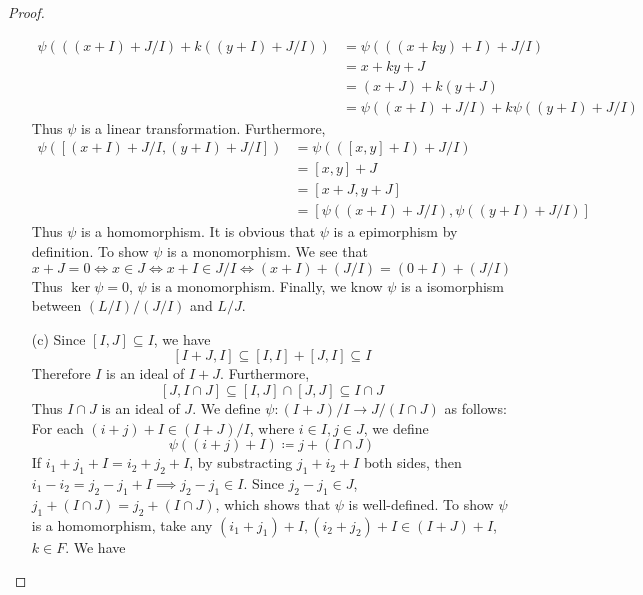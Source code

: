 \documentclass[../main.tex]{subfiles}
\begin{document}
\begin{proof}
\begin{enumerate}
\[\begin{aligned}
          \psi \left( \left( \left( x+ I \right)+ J/I  \right)+ k \left( \left( y+ I \right)+ J /I  \right)   \right)&=  \psi \left( \left(\left( x+ ky \right)+ I  \right)+ J/I  \right)  \\ 
           &= x+ ky+ J\\ 
            &= \left( x+ J \right)+ k\left( y+ J \right)\\ 
             &=  \psi \left( \left( x+ I \right)+  J / I  \right)+  k \psi  \left( \left( y+ I \right)+  J / I  \right)    
         \end{aligned} 
          \]  Thus \(  \psi   \) is a linear transformation. Furthermore, \[
          \begin{aligned}
          \psi \left( [\left( x+ I \right)+ J/I , \left( y+ I \right)+ J /I ] \right)&= \psi \left( \left( [x,y]+ I \right)+ J/I  \right)\\ 
           &= [x,y]   + J\\ 
            &= [x+ J, y+ J]\\ 
             &= [\psi \left( \left( x+ I \right)+ J / I  \right), \psi \left( \left( y+ I \right)+ J / I  \right)  ]
          \end{aligned}
          \] Thus \(  \psi   \) is a homomorphism. It is obvious that \(  \psi   \) is a epimorphism by definition. To show \(  \psi   \) is a monomorphism. We see that \[
          x+ J= 0\iff x \in J\iff x+ I \in J/I\iff \left( x+ I \right)+ \left( J / I \right)= \left( 0+ I \right)+  \left( J / I \right)    
          \]Thus \(  \operatorname{ker}\psi = 0  \), \(  \psi   \) is a monomorphism.   Finally, we know \(  \psi    \) is a isomorphism between \(  \left( L / I \right)/ \left( J / I \right)    \)  and \(  L/J  \). 
          \item[(c)] Since \(  [I,J]\subseteq I  \), we have \[
          [I+ J,I]\subseteq [I,I]+ [J,I]\subseteq I
          \] Therefore \(  I  \) is an ideal of \(  I+ J  \).   Furthermore,  \[
          [J, I\cap J]\subseteq [I,J]\cap [J,J]\subseteq I\cap J
          \]   Thus \(  I\cap J  \) is an ideal of \(  J  \).  We define \(  \psi :\left( I+ J \right)/I\to  J/\left( I\cap J \right)    \) as follows: For each \(  \left( i+ j \right)+  I \in \left( I+ J \right)/ I    \), where \(  i\in I, j \in J  \), we define \[
          \psi \left( \left( i+ j \right)+ I \right)\coloneqq  j+  \left( I\cap J \right)  
          \]  If \(  i_1+ j_1+ I= i_2+ j_2  + I\), by substracting \(  j_1+ i_2 + I \) both sides,  then  \(  i_1-i_2= j_2-j_1+ I\implies j_2-j_1\in I \). Since \(  j_2-j_1\in J  \),   \(  j_1+ \left( I\cap J \right)= j_2+ \left( I\cap J \right)    \), which shows that \(  \psi   \) is well-defined. To show \(  \psi   \) is a homomorphism, take any \(  \left( i_1+ j_1 \right)+ I, \left( i_2+ j_2 \right)+ I \in  \left( I+ J \right)+ I     \), \(  k \in F  \). We have \[
\]
\end{enumerate}
\end{proof}
\end{document}
